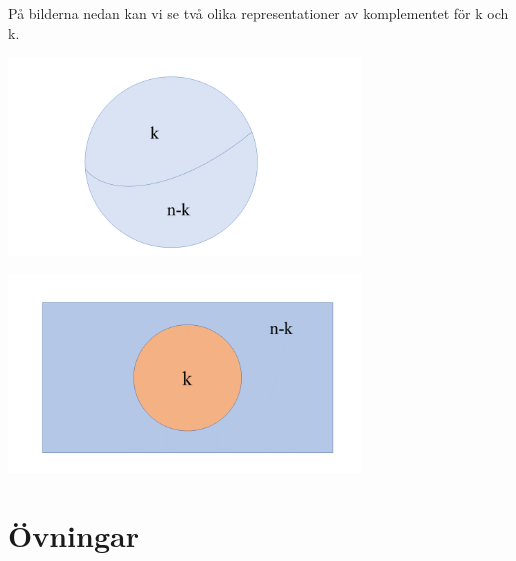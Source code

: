 \documentclass{tufte-handout}
\begin{document}
 På bilderna nedan kan vi se två olika representationer av komplementet för k och k. 
 
\begin{center}
    \includegraphics[width=0.7\textwidth]{graphics/komplementbild1.png}
\end{center}

\begin{center}
    \includegraphics[width=0.7\textwidth]{graphics/komplementbild2.png}
 \end{center}

\hfill

\break

\section{Övningar}
\end{document}
